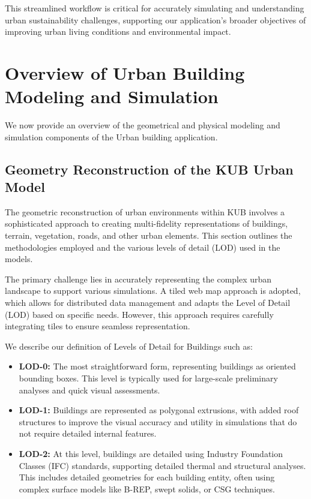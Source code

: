 \documentclass[runningheads]{llncs}
\begin{document}
This streamlined workflow is critical for accurately simulating and understanding urban sustainability challenges, supporting our application's broader objectives of improving urban living conditions and environmental impact.


\section{Overview of Urban Building Modeling and Simulation}
\label{sec:urban-building}

We now provide an overview of the geometrical and physical modeling and simulation components of the Urban building application.

\subsection{Geometry Reconstruction of the KUB Urban Model}

The geometric reconstruction of urban environments within KUB involves a sophisticated approach to creating multi-fidelity representations of buildings, terrain, vegetation, roads, and other urban elements. This section outlines the methodologies employed and the various levels of detail (LOD) used in the models.


The primary challenge lies in accurately representing the complex urban landscape to support various simulations. A tiled web map approach is adopted, which allows for distributed data management and adapts the Level of Detail (LOD) based on specific needs. However, this approach requires carefully integrating tiles to ensure seamless representation.


We describe our definition of Levels of Detail for Buildings such as:
\begin{itemize}
    \item \textbf{LOD-0:} The most straightforward form, representing buildings as oriented bounding boxes. This level is typically used for large-scale preliminary analyses and quick visual assessments.
    \item \textbf{LOD-1:} Buildings are represented as polygonal extrusions, with added roof structures to improve the visual accuracy and utility in simulations that do not require detailed internal features.
    \item \textbf{LOD-2:} At this level, buildings are detailed using Industry Foundation Classes (IFC) standards, supporting detailed thermal and structural analyses. This includes detailed geometries for each building entity, often using complex surface models like B-REP, swept solids, or CSG techniques.
\end{itemize}
\end{document}
